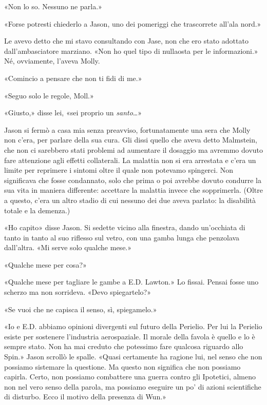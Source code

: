 «Non lo so. Nessuno ne parla.»

«Forse potresti chiederlo a Jason, uno dei pomeriggi che trascorrete
all'ala nord.»

Le avevo detto che mi stavo consultando con Jase, non che ero stato
adottato dall'ambasciatore marziano. «Non ho quel tipo di nullaosta per
le informazioni.» Né, ovviamente, l'aveva Molly.

«Comincio a pensare che non ti fidi di me.»

«Seguo solo le regole, Moll.»

«Giusto,» disse lei, «sei proprio un \emph{santo}\ldots»

\separatorefiori

Jason si fermò a casa mia senza preavviso, fortunatamente una sera che
Molly non c'era, per parlare della sua cura. Gli dissi quello che aveva
detto Malmstein, che non ci sarebbero stati problemi ad aumentare il
dosaggio ma avremmo dovuto fare attenzione agli effetti collaterali. La
malattia non si era arrestata e c'era un limite per reprimere i sintomi
oltre il quale non potevamo spingerci. Non significava che fosse
condannato, solo che prima o poi avrebbe dovuto condurre la sua vita in
maniera differente: accettare la malattia invece che sopprimerla. (Oltre
a questo, c'era un altro stadio di cui nessuno dei due aveva parlato: la
disabilità totale e la demenza.)

«Ho capito» disse Jason. Si sedette vicino alla finestra, dando
un'occhiata di tanto in tanto al suo riflesso sul vetro, con una gamba
lunga che penzolava dall'altra. «Mi serve solo qualche mese.»

«Qualche mese per cosa?»

«Qualche mese per tagliare le gambe a E.D. Lawton.» Lo fissai. Pensai
fosse uno scherzo ma non sorrideva. «Devo spiegartelo?»

«Se vuoi che ne capisca il senso, sì, spiegamelo.»

«Io e E.D. abbiamo opinioni divergenti sul futuro della Perielio. Per
lui la Perielio esiste per sostenere l'industria aerospaziale. Il morale
della favola è quello e lo è sempre stato. Non ha mai creduto che
potessimo fare qualcosa riguardo allo Spin.» Jason scrollò le spalle.
«Quasi certamente ha ragione lui, nel senso che non possiamo sistemare
la questione. Ma questo non significa che non possiamo capirla. Certo,
non possiamo combattere una guerra contro gli Ipotetici, almeno non nel
vero senso della parola, ma possiamo eseguire un po' di azioni
scientifiche di disturbo. Ecco il motivo della presenza di Wun.»

